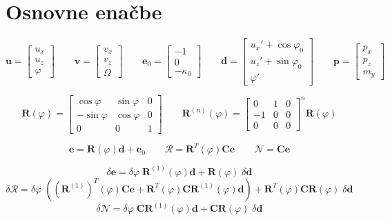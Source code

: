 \documentclass{article}
\newcommand{\dep}[1]{{\scriptstyle(#1)}}
\begin{document}
\section{Osnovne enačbe}
$$\mathbf{u} = 
\begin{bmatrix}
	u_x\\
	u_z\\
	\varphi
\end{bmatrix} \qquad \mathbf{v} = 
\begin{bmatrix}
	v_x\\
	v_z\\
	\Omega
\end{bmatrix} \qquad \mathbf{e}_0=
\begin{bmatrix}
	-1\\
	0\\
	-\kappa_0
\end{bmatrix} \qquad \mathbf{d} = 
\begin{bmatrix}
	u_x' + \cos\varphi_0\\
	u_z' + \sin\varphi_0\\
	\varphi'
\end{bmatrix} \qquad \mathbf{p} = 
\begin{bmatrix}
	p_x\\
	p_z\\
	m_y
\end{bmatrix}
$$


$$\mathbf{R}\dep{\varphi} =
\begin{bmatrix}
	\cos\varphi & \sin \varphi & 0\\
	-\sin\varphi & \cos\varphi & 0\\
	0 & 0 & 1
\end{bmatrix} \qquad \mathbf{R}^{(n)}\dep{\varphi} = 
\begin{bmatrix}
	0 & 1 & 0\\
	-1 & 0 & 0\\
	0 & 0 & 0
\end{bmatrix}^n \mathbf{R}\dep{\varphi}
$$


$$\mathbf{e} = \mathbf{R}\dep{\varphi}\mathbf{d}+\mathbf{e}_0 \qquad \mathcal{R} = \mathbf{R}^T\dep{\varphi}\mathbf{Ce} \qquad \mathcal{N} = \mathbf{Ce}$$


$$\delta \mathbf{e} = \delta\varphi\;\mathbf{R}^{(1)}\dep{\varphi}\mathbf{d} + \mathbf{R}\dep{\varphi}\;\delta \mathbf{d}$$
$$\delta \mathcal{R} = \delta\varphi\;((\mathbf{R}^{(1)})^T\dep{\varphi}\mathbf{Ce}+\mathbf{R}^T\dep{\varphi}\mathbf{CR}^{(1)}\dep{\varphi}\mathbf{d}) +  \mathbf{R}^T\dep{\varphi}\mathbf{CR}\dep{\varphi}\;\delta \mathbf{d}$$
$$\delta \mathcal{N} = \delta\varphi\;\mathbf{CR}^{(1)}\dep{\varphi}\mathbf{d} +  \mathbf{CR}\dep{\varphi}\;\delta \mathbf{d}$$
\end{document}
